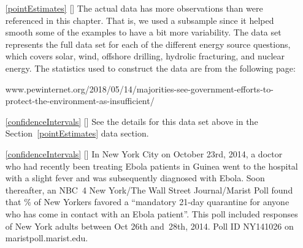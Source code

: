 \begin{itemize}
\item[\ref{pointEstimates}]
    [\datalink{pew\_energy\_2018}]
    The actual data has more observations than were referenced
    in this chapter.
    That is, we used a subsample since it helped smooth some
    of the examples to have a bit more variability.
    The  data set represents
    the full data set for each of the different energy source
    questions, which covers solar, wind, offshore drilling,
    hydrolic fracturing, and nuclear energy.
    The statistics used to construct the data are from
    the following page:
    \begin{center}
        {{\small{www.pewinternet.org/2018/05/14/majorities-see-government-efforts-to-protect-the-environment-as-insufficient/}}}
    \end{center}
    
\item[\ref{confidenceIntervals}]
    [\datalink{pew\_energy\_2018}]
    See the details for this data set above
    in the Section~\ref{pointEstimates} data section.
\item[\ref{confidenceIntervals}]
    [\datalink{ebola\_survey}]
    In New York City on October 23rd, 2014, a doctor who had
    recently been treating Ebola patients in Guinea went to
    the hospital with a slight fever and was subsequently
    diagnosed with Ebola.
    Soon thereafter, an NBC~4 New York/The Wall Street
    Journal/Marist Poll found that
    \wsjebolapollpercent{}\% of New Yorkers favored a
    ``mandatory 21-day quarantine for anyone who has come
    in contact with an Ebola patient''.
    This poll included responses of \wsjebolapollsizecomma{}
    New York adults between Oct 26th and~28th, 2014.
        {Poll ID NY141026 on maristpoll.marist.edu}.


\end{itemize}

